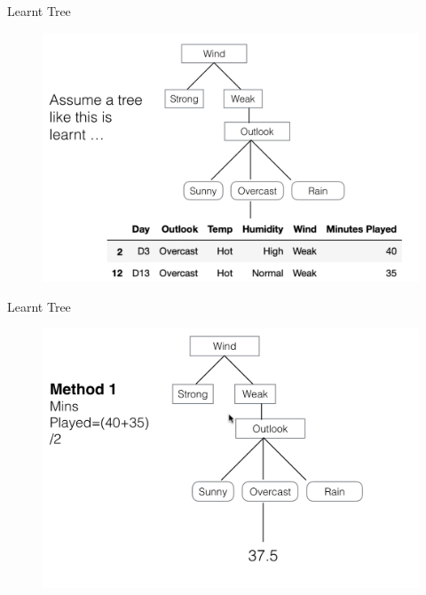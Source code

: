 \documentclass[usenames,dvipsnames]{beamer}
\begin{document}
\begin{frame}{Learnt Tree}
\begin{figure}
	\centering
	\includegraphics[width=1\linewidth]{../assets/decision-trees/diagrams/tree}

	\label{fig:tree}
\end{figure}

\end{frame}

\begin{frame}{Learnt Tree}
\begin{figure}
	\centering
	\includegraphics[width=1\linewidth]{../assets/decision-trees/diagrams/tree2}

	\label{fig:tree}
\end{figure}

\end{frame}
\end{document}
